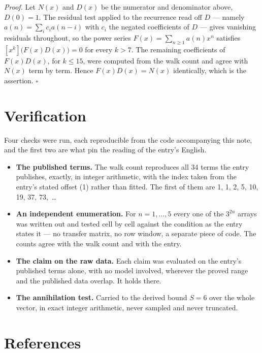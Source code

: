 \documentclass[11pt]{article}
\theoremstyle{definition}
\begin{document}
{\itshape Proof.} Let $N(x)$ and $D(x)$ be the numerator and denominator above, $D(0)=1$. The residual test applied to the recurrence read off $D$ --- namely $a(n) = \sum_i c_i a(n-i)$ with $c_i$ the negated coefficients of $D$ --- gives vanishing residuals throughout, so the power series $F(x)=\sum_{n\ge 1}a(n)x^n$ satisfies $[x^k]\bigl(F(x)D(x)\bigr) = 0$ for every $k > 7$. The remaining coefficients of $F(x)D(x)$, for $k \le 15$, were computed from the walk count and agree with $N(x)$ term by term. Hence $F(x)D(x) = N(x)$ identically, which is the assertion. $\square$

\section{Verification}

Four checks were run, each reproducible from the code accompanying this note, and the first two are what pin the reading of the entry's English.

\begin{itemize}

\item {\bfseries The published terms.} The walk count reproduces all 34 terms the entry publishes, exactly, in integer arithmetic, with the index taken from the entry's stated offset (1) rather than fitted. The first of them are 1, 1, 2, 5, 10, 19, 37, 73,~\dots

\item {\bfseries An independent enumeration.} For $n = 1,\dots,5$ every one of the $3^{2n}$ arrays was written out and tested cell by cell against the condition as the entry states it --- no transfer matrix, no row window, a separate piece of code. The counts agree with the walk count and with the entry.

\item {\bfseries The claim on the raw data.} Each claim was evaluated on the entry's published terms alone, with no model involved, wherever the proved range and the published data overlap. It holds there.

\item {\bfseries The annihilation test.} Carried to the derived bound $S = 6$ over the whole vector, in exact integer arithmetic, never sampled and never truncated.

\end{itemize}

\section{References}
\end{document}
